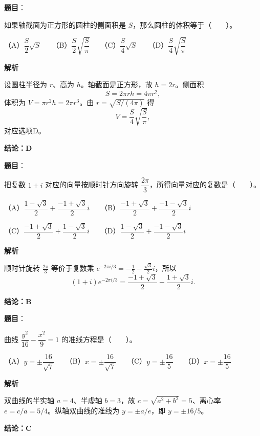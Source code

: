 \begin{answer}

\textbf{题目}：

如果轴截面为正方形的圆柱的侧面积是 $S$，那么圆柱的体积等于\mbox{（　　）}。

（A）$\dfrac S2\sqrt S$　　（B）$\dfrac S2\sqrt{\dfrac S\pi}$　　（C）$\dfrac S4\sqrt S$　　（D）$\dfrac S4\sqrt{\dfrac S\pi}$

\textbf{解析}

设圆柱半径为 $r$、高为 $h$。轴截面是正方形，故 $h=2r$。侧面积
\nopagebreak[4]
\[
S=2\pi rh=4\pi r^2,
\]
体积为 $V=\pi r^2h=2\pi r^3$。由 $r=\sqrt{S/(4\pi)}$ 得
\nopagebreak[4]
\[
V=\frac S4\sqrt{\frac S\pi},
\]
对应选项D。

\textbf{结论：D}


\end{answer}
\begin{answer}

\textbf{题目}：

把复数 $1+i$ 对应的向量按顺时针方向旋转 $\dfrac{2\pi}{3}$，所得向量对应的复数是\mbox{（　　）}。

（A）$\dfrac{1-\sqrt3}{2}+\dfrac{-1+\sqrt3}{2}i$　　（B）$\dfrac{-1+\sqrt3}{2}+\dfrac{-1-\sqrt3}{2}i$

（C）$\dfrac{-1+\sqrt3}{2}+\dfrac{1-\sqrt3}{2}i$　　（D）$\dfrac{1-\sqrt3}{2}+\dfrac{-1-\sqrt3}{2}i$

\textbf{解析}

顺时针旋转 $\frac{2\pi}{3}$ 等价于复数乘 $e^{-2\pi i/3}=-\frac12-\frac{\sqrt3}{2}i$，所以
\nopagebreak[4]
\[
(1+i)e^{-2\pi i/3}=\frac{-1+\sqrt3}{2}-\frac{1+\sqrt3}{2}i.
\]

\textbf{结论：B}


\end{answer}
\begin{answer}

\textbf{题目}：

曲线 $\dfrac{y^2}{16}-\dfrac{x^2}{9}=1$ 的准线方程是\mbox{（　　）}。

（A）$y=\pm\dfrac{16}{\sqrt7}$　　（B）$x=\pm\dfrac{16}{\sqrt7}$　　（C）$y=\pm\dfrac{16}{5}$　　（D）$x=\pm\dfrac{16}{5}$

\textbf{解析}

双曲线的半实轴 $a=4$、半虚轴 $b=3$，故 $c=\sqrt{a^2+b^2}=5$、离心率 $e=c/a=5/4$。纵轴双曲线的准线为 $y=\pm a/e$，即 $y=\pm16/5$。

\textbf{结论：C}


\end{answer}
